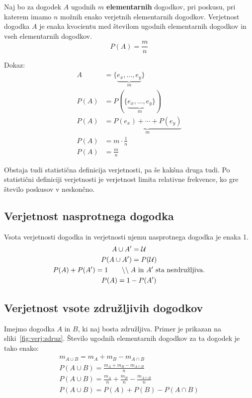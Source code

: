 \documentclass[a4paper,oneside,12pt,fleqn]{article}
\newcommand\krat\cdot
\newcommand{\comment}[1]{\ensuremath{\qquad\backslash\backslash\;}\textnormal{#1}}
\numberwithin{equation}{section}
\begin{document}
Naj bo za dogodek $A$ ugodnih $m$ \textbf{elementarnih} dogodkov, pri poskusu, pri katerem imamo
$n$ možnih enako verjetnih elementarnih dogodkov. Verjetnost dogodka $A$ je enaka
kvocientu med številom ugodnih elementarnih dogodkov in vseh elementarnih dogodkov.
\[ P(A) = \frac{m}{n} \]

Dokaz:
\begin{align*}
  A &= \{\underbrace{e_x, \ldots, e_y}_m\} \\
  P(A) &= P(\{\underbrace{e_x, \ldots, e_y}_m\}) \\
  P(A) &= \underbrace{P(e_x) + \cdots + P(e_y)}_m \\
  P(A) &= m \krat \frac{1}{n} \\
  P(A) &= \frac{m}{n}
\end{align*}

Obstaja tudi statistična definicija verjetnosti, pa še kakšna druga tudi. Po statistični
definiciji verjetnosti je verjetnost limita relativne frekvence, ko gre število poskusov v
neskončno. 

\subsection{Verjetnost nasprotnega dogodka}
\label{sec:verj:nasp}
Vsota verjetnosti dogodka in verjetnosti njemu nasprotnega dogodka je enaka 1.
\begin{gather*}
  A \cup A' = \mathcal U \\
  P(A \cup A') = P(\mathcal U) \\
  P(A) + P(A') = 1 \comment{$A$ in $A'$ sta nezdružljiva.} \\
  P(A) = 1 - P(A')  
\end{gather*}

\subsection{Verjetnost vsote združljivih dogodkov}
\label{sec:verj:zdruz}

Imejmo dogodka $A$ in $B$, ki naj bosta združljiva. Primer je prikazan na
sliki~\ref{fig:verj:zdruz}.
Število ugodnih elementarnih dogodkov za ta dogodek je tako enako:
\begin{gather*}
  m_{A\cup B} = m_A + m_B - m_{A\cap B} \\
  P(A \cup B) = \frac{m_A + m_B - m_{A\cap B}}{n} \\
  P(A \cup B) = \frac{m_A}{n} + \frac{m_B}{n} - \frac{m_{A\cap B}}{n} \\
  P(A \cup B) = P(A) + P(B) - P(A\cap B)
\end{gather*}
\end{document}
